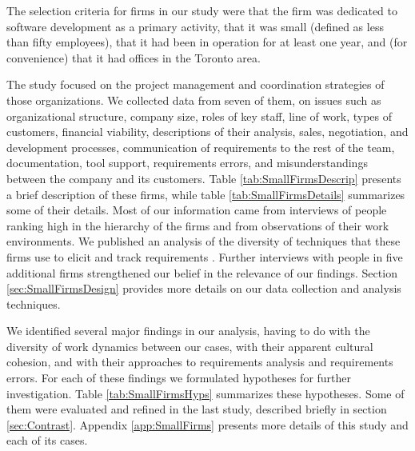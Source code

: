 The selection criteria for firms in our study were that the firm was dedicated to software development as a primary activity, that it was small (defined as less than fifty employees), that it had been in operation for at least one year, and (for convenience) that it had offices in the Toronto area.

The study focused on the project management and coordination strategies of those organizations. We collected data from seven of them, on issues such as organizational structure, company size, roles of key staff, line of work, types of customers, financial viability, descriptions of their analysis, sales, negotiation, and development processes, communication of requirements to the rest of the team, documentation, tool support, requirements errors, and misunderstandings between the company and its customers. Table \ref{tab:SmallFirmsDescrip} presents a brief description of these firms, while table \ref{tab:SmallFirmsDetails} summarizes some of their details. Most of our information came from interviews of people ranking high in the hierarchy of the firms and from observations of their work environments. We published an analysis of the diversity of techniques that these firms use to elicit and track requirements \cite{Aranda2007}. Further interviews with people in five additional firms strengthened our belief in the relevance of our findings. Section \ref{sec:SmallFirmsDesign} provides more details on our data collection and analysis techniques.

We identified several major findings in our analysis, having to do with the diversity of work dynamics between our cases, with their apparent cultural cohesion, and with their approaches to requirements analysis and requirements errors. For each of these findings we formulated hypotheses for further investigation. Table \ref{tab:SmallFirmsHyps} summarizes these hypotheses. Some of them were evaluated and refined in the last study, described briefly in section \ref{sec:Contrast}. Appendix \ref{app:SmallFirms} presents more details of this study and each of its cases.



